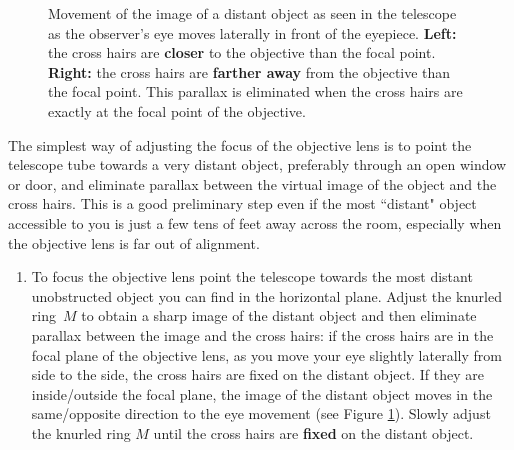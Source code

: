 \documentclass[12pt]{article}
\begin{document}
\begin{figure}[ht!]
    \centering
    \caption{Movement of the image of a distant object  as seen in the telescope as the observer's eye moves laterally in front of the eyepiece. \textbf{Left:} the cross hairs are \textbf{closer} to the objective than the focal point. \textbf{Right:} the cross hairs are \textbf{farther away} from the objective than the focal point. This parallax is eliminated when the cross hairs are exactly at the focal point of the objective.}
    \label{Eye movement}
\end{figure}

The simplest way of adjusting the focus of the objective lens is to point the telescope tube towards a very distant object, preferably through an open window or door, and eliminate parallax between the virtual image of the object and the cross hairs. This is a good preliminary step even if the most ``distant" object accessible to you is just a few tens of feet away across the room, especially when the objective lens is far out of alignment.

\begin{enumerate}[resume]
\item To focus the objective lens point the telescope towards the most distant unobstructed object you can find in the horizontal plane. Adjust the knurled ring~$M$ to obtain a sharp image of the distant object and then eliminate parallax between the image and the cross hairs: if the cross hairs are in the focal plane of the objective lens, as you move your eye slightly laterally from side to the side, the cross hairs are fixed on the distant object. If they are inside/outside the focal plane, the image of the distant object moves in the same/opposite direction to the eye movement (see Figure \ref{Eye movement}). Slowly adjust the knurled ring $M$ until the cross hairs are \textbf{fixed} on the distant object.
\end{enumerate}
\end{document}
